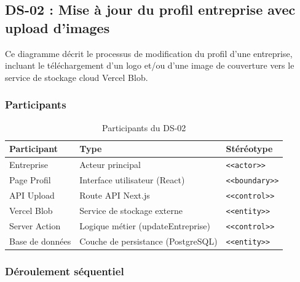 \documentclass[12pt,a4paper]{article}
\begin{document}
\newpage
\subsection{DS-02 : Mise à jour du profil entreprise avec upload d'images}

Ce diagramme décrit le processus de modification du profil d'une entreprise, incluant le téléchargement d'un logo et/ou d'une image de couverture vers le service de stockage cloud Vercel Blob.

\subsubsection{Participants}

\begin{table}[h!]
\centering
\begin{tabular}{lll}
\toprule
\textbf{Participant} & \textbf{Type} & \textbf{Stéréotype} \\
\midrule
Entreprise & Acteur principal & \texttt{<<actor>>} \\
Page Profil & Interface utilisateur (React) & \texttt{<<boundary>>} \\
API Upload & Route API Next.js & \texttt{<<control>>} \\
Vercel Blob & Service de stockage externe & \texttt{<<entity>>} \\
Server Action & Logique métier (updateEntreprise) & \texttt{<<control>>} \\
Base de données & Couche de persistance (PostgreSQL) & \texttt{<<entity>>} \\
\bottomrule
\end{tabular}
\caption{Participants du DS-02}
\end{table}

\subsubsection{Déroulement séquentiel}
\end{document}
